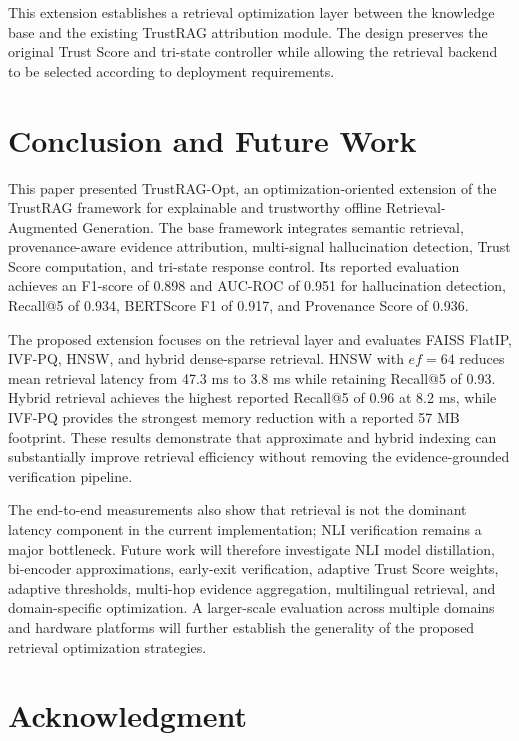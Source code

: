 \documentclass[conference]{IEEEtran}
\begin{document}
This extension establishes a retrieval optimization layer between the knowledge base and the existing TrustRAG attribution module. The design preserves the original Trust Score and tri-state controller while allowing the retrieval backend to be selected according to deployment requirements.

\section{Conclusion and Future Work}

This paper presented TrustRAG-Opt, an optimization-oriented extension of the TrustRAG framework for explainable and trustworthy offline Retrieval-Augmented Generation. The base framework integrates semantic retrieval, provenance-aware evidence attribution, multi-signal hallucination detection, Trust Score computation, and tri-state response control. Its reported evaluation achieves an F1-score of 0.898 and AUC-ROC of 0.951 for hallucination detection, Recall@5 of 0.934, BERTScore F1 of 0.917, and Provenance Score of 0.936.

The proposed extension focuses on the retrieval layer and evaluates FAISS FlatIP, IVF-PQ, HNSW, and hybrid dense-sparse retrieval. HNSW with $ef=64$ reduces mean retrieval latency from 47.3 ms to 3.8 ms while retaining Recall@5 of 0.93. Hybrid retrieval achieves the highest reported Recall@5 of 0.96 at 8.2 ms, while IVF-PQ provides the strongest memory reduction with a reported 57 MB footprint. These results demonstrate that approximate and hybrid indexing can substantially improve retrieval efficiency without removing the evidence-grounded verification pipeline.

The end-to-end measurements also show that retrieval is not the dominant latency component in the current implementation; NLI verification remains a major bottleneck. Future work will therefore investigate NLI model distillation, bi-encoder approximations, early-exit verification, adaptive Trust Score weights, adaptive thresholds, multi-hop evidence aggregation, multilingual retrieval, and domain-specific optimization. A larger-scale evaluation across multiple domains and hardware platforms will further establish the generality of the proposed retrieval optimization strategies.

\section*{Acknowledgment}
\end{document}
